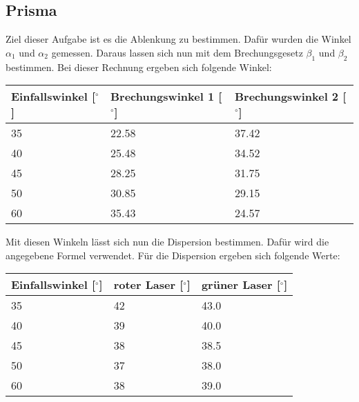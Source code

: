 \subsection{Prisma}

Ziel dieser Aufgabe ist es die Ablenkung zu bestimmen. Dafür wurden die Winkel $\alpha_1$ und $\alpha_2$ gemessen. Daraus lassen sich nun mit dem Brechungsgesetz $\beta_1$ und $\beta_2$ bestimmen.
Bei dieser Rechnung ergeben sich folgende Winkel:

\begin{minipage}{\linewidth}
    \begin{table}[H]
        \centering
    \begin{tabular}{lll}
        \toprule
        Einfallswinkel [$^\circ$] & Brechungswinkel 1 [$^\circ$] & Brechungswinkel 2 [$^\circ$]  \\
        \midrule
        35 & 22.58 & 37.42 \\
        40 & 25.48 & 34.52 \\
        45 & 28.25 & 31.75 \\
        50 & 30.85 & 29.15 \\
        60 & 35.43 & 24.57 \\
        \bottomrule   
    \end{tabular}
    
    \label{tab:5}
\end{table}
\end{minipage}

\noindent Mit diesen Winkeln lässt sich nun die Dispersion bestimmen. Dafür wird die angegebene Formel verwendet. Für die Dispersion ergeben sich folgende Werte:

\begin{minipage}{\linewidth}
    \begin{table}[H]
        \centering
    \begin{tabular}{lll}
        \toprule
        Einfallswinkel [$^\circ$] & roter Laser [$^\circ$] & grüner Laser [$^\circ$]  \\
        \midrule
        35 & 42 & 43.0 \\
        40 & 39 & 40.0 \\
        45 & 38 & 38.5 \\
        50 & 37 & 38.0 \\
        60 & 38 & 39.0 \\
        \bottomrule   
    \end{tabular}
    
    \label{tab:6}
\end{table}
\end{minipage}

